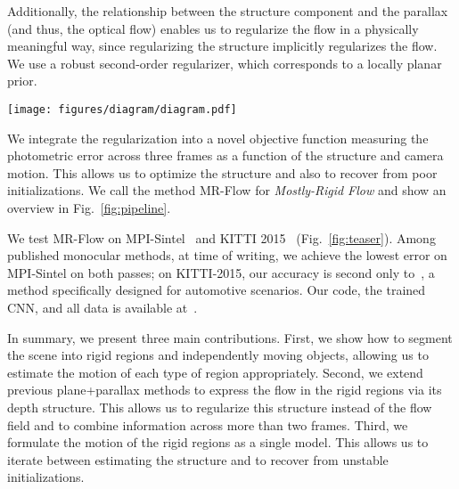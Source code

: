 \documentclass[10pt,twocolumn,letterpaper]{article}
\begin{document}
Additionally, the relationship between the structure component and the parallax (and thus, the optical flow) enables us to regularize the flow in a physically meaningful way, since regularizing the structure implicitly regularizes the flow.
We use a robust second-order regularizer, which corresponds to a locally planar prior.


\begin{figure*}
\texttt{[image: figures/diagram/diagram.pdf]}
\caption{Algorithm overview.
Given a triplet of frames, we first compute initial flow and an initial rigidity estimate based on a semantic segmentation CNN.
The images are then aligned to a common plane, and the initial flow is converted to an estimate of the structure in the rigid scene using the Plane+Parallax framework.
Where the P+P constraints are violated, the rigidity is refined, while at the same time the structure is refined using a variational optimization.
To obtain the final flow estimate, the initial flow is used in moving regions, while the refined structure induces the flow in the rigid scene.}
\label{fig:pipeline}
\end{figure*}



We integrate the regularization into a novel objective function measuring the photometric error across three frames as a function of the structure and camera motion.
This allows us to optimize the structure and also to recover from poor initializations.
We call the method MR-Flow for {\em Mostly-Rigid Flow} and show an overview in Fig.~\ref{fig:pipeline}.



We test MR-Flow on MPI-Sintel~\cite{Butler:ECCV:Sintel} and KITTI 2015~\cite{Menze:2015:OSF}
(Fig.~\ref{fig:teaser}).
Among published monocular methods, at time of writing, we achieve the lowest error on MPI-Sintel on both passes;
on KITTI-2015, our accuracy is second only to~\cite{Bai:2016:SemanticDeepFlow}, a method specifically designed for automotive scenarios.
Our code, the trained CNN, and all data is available at~\cite{MRFlow:Website}.

In summary, we present three main contributions.
First, we show how to segment the scene into rigid regions and independently moving objects, allowing us to estimate the motion of each type of region appropriately.
Second, we extend previous plane+parallax methods to express the flow in the rigid regions via its depth structure.
This allows us to regularize this structure instead of the flow field and to combine information across more than two frames.
Third, we formulate the motion of the rigid regions as a single model.
This allows us to iterate between estimating the structure and to recover from unstable initializations.
\end{document}
